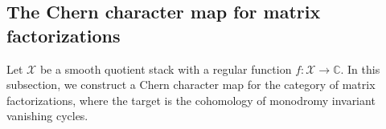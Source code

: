 \documentclass [11pt,oneside,a4paper,mathscr]{amsart}
\theoremstyle{definition}
\newcommand{\X}{\mathscr{X}}
\begin{document}


\subsection{The Chern character map for matrix factorizations}\label{subsec:ChernMF}
Let $\X$ be a smooth quotient stack with a regular 
function $f \colon \X \to \mathbb{C}$. 
In this subsection, we construct a Chern character map
for the category of matrix factorizations, where 
the target is the cohomology of monodromy invariant vanishing cycles. 
\end{document}
